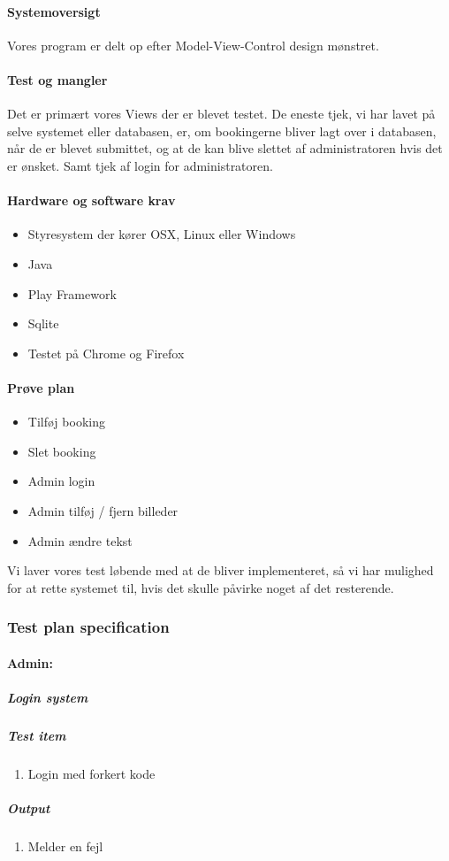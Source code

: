\documentclass[12pt,a4paper]{article}
\begin{document}
\paragraph{Systemoversigt}	
Vores program er delt op efter Model-View-Control design mønstret. 

\paragraph{Test og mangler}
Det er primært vores Views der er blevet testet. De eneste tjek, vi har lavet på selve systemet eller databasen, er, om bookingerne bliver lagt over i databasen, når de er blevet submittet, og at de kan blive slettet af administratoren hvis det er ønsket. Samt tjek af login for administratoren. 

\paragraph{Hardware og software krav}
\begin{itemize}
	\item Styresystem der kører OSX, Linux eller Windows
	\item Java
	\item Play Framework
	\item Sqlite
	\item Testet på Chrome og Firefox
\end{itemize}
\paragraph{Prøve plan}
\begin{itemize}
	\item Tilføj booking
	\item Slet booking
	\item Admin login
	\item Admin tilføj / fjern billeder
	\item Admin ændre tekst
\end{itemize}
Vi laver vores test løbende med at de bliver implementeret, så vi har mulighed for at rette systemet til, hvis det skulle påvirke noget af det resterende.

\subsubsection{Test plan specification}
\paragraph{Admin:}
\subparagraph{Login system}
\subparagraph{Test item}
\begin{enumerate}
\item Login med forkert kode
\end{enumerate}
\subparagraph{Output}
\begin{enumerate}
\item Melder en fejl
\end{enumerate}
\end{document}
